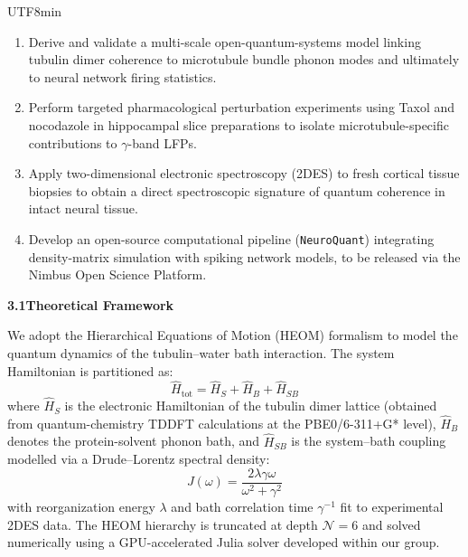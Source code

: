 \documentclass[11pt,a4paper]{article}
\newcommand{\bilabel}[2]{%
  \textbf{\textcolor{jspsNavy}{#1}}\enspace{\footnotesize\textcolor{jspsSlate}{(#2)}}%
}
\begin{document}
\begin{CJK}{UTF8}{min}
\begin{tcolorbox}[jspsSection,
  title={\faFile\enspace \bilabel{Research Background and Objectives}{研究の背景と目的} \hfill \small Section 2}]
\begin{enumerate}[leftmargin=1.6em, label=\textbf{O\arabic*.}, itemsep=1pt]
  \item Derive and validate a multi-scale open-quantum-systems model linking tubulin dimer coherence to microtubule bundle phonon modes and ultimately to neural network firing statistics.
  \item Perform targeted pharmacological perturbation experiments using Taxol and nocodazole in hippocampal slice preparations to isolate microtubule-specific contributions to $\gamma$-band LFPs.
  \item Apply two-dimensional electronic spectroscopy (2DES) to fresh cortical tissue biopsies to obtain a direct spectroscopic signature of quantum coherence in intact neural tissue.
  \item Develop an open-source computational pipeline (\texttt{NeuroQuant}) integrating density-matrix simulation with spiking network models, to be released via the Nimbus Open Science Platform.
\end{enumerate}

\end{tcolorbox}

\vspace{4pt}

\begin{tcolorbox}[jspsSection,
  title={\faPen\enspace \bilabel{Research Methods}{研究方法} \hfill \small Section 3}]

\textbf{\textcolor{jspsNavy}{3.1\enspace Theoretical Framework}}

We adopt the Hierarchical Equations of Motion (HEOM) formalism to model the quantum dynamics of the tubulin--water bath interaction. The system Hamiltonian is partitioned as:
\[
  \hat{H}_{\mathrm{tot}} = \hat{H}_S + \hat{H}_B + \hat{H}_{SB}
\]
where $\hat{H}_S$ is the electronic Hamiltonian of the tubulin dimer lattice (obtained from quantum-chemistry TDDFT calculations at the PBE0/6-311+G* level), $\hat{H}_B$ denotes the protein-solvent phonon bath, and $\hat{H}_{SB}$ is the system--bath coupling modelled via a Drude--Lorentz spectral density:
\[
  J(\omega) = \frac{2\lambda \gamma \omega}{\omega^2 + \gamma^2}
\]
with reorganization energy $\lambda$ and bath correlation time $\gamma^{-1}$ fit to experimental 2DES data. The HEOM hierarchy is truncated at depth $\mathcal{N} = 6$ and solved numerically using a GPU-accelerated Julia solver developed within our group.


\end{tcolorbox}
\end{CJK}
\end{document}
